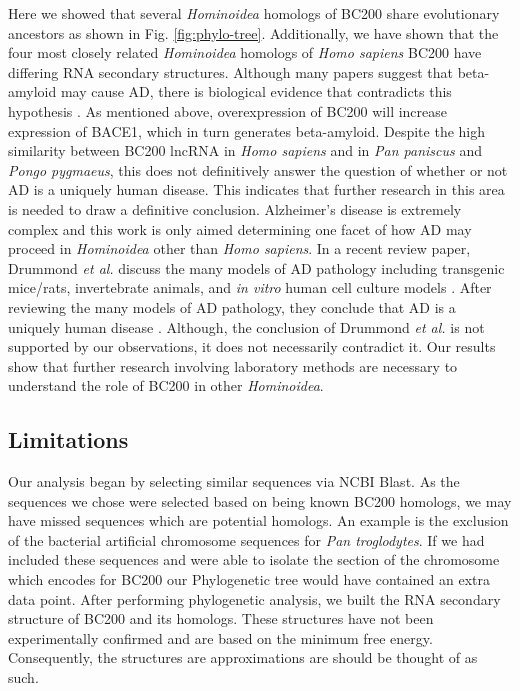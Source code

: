 \documentclass[conference, 11pt]{IEEEtran}
\begin{document}
Here we showed that several \emph{Hominoidea} homologs of BC200 share evolutionary ancestors as shown in Fig. \ref{fig:phylo-tree}. 
Additionally, we have shown that the four most closely related \emph{Hominoidea} homologs of \emph{Homo sapiens} BC200 have differing RNA secondary structures.
Although many papers suggest that beta-amyloid may cause AD, there is biological evidence that contradicts this hypothesis \cite{selkoe2016amyloid}.
As mentioned above, overexpression of BC200 will increase expression of BACE1, which in turn generates beta-amyloid. 
Despite the high similarity between BC200 lncRNA in \emph{Homo sapiens} and in \emph{Pan paniscus} and \emph{Pongo pygmaeus}, this does not definitively answer the question of whether or not AD is a uniquely human disease.
This indicates that further research in this area is needed to draw a definitive conclusion. 
Alzheimer’s disease is extremely complex and this work is only aimed determining one facet of how AD may proceed in \emph{Hominoidea} other than \emph{Homo sapiens}. 
In a recent review paper, Drummond \emph{et al.} discuss the many models of AD pathology including transgenic mice/rats, invertebrate animals, and \emph{in vitro} human cell culture models \cite{drummond2017alzheimer}. 
After reviewing the many models of AD pathology, they conclude that AD is a uniquely human disease \cite{drummond2017alzheimer}. 
Although, the conclusion of Drummond \emph{et al.} is not supported by our observations, it does not necessarily contradict it. 
Our results show that further research involving laboratory methods are necessary to understand the role of BC200 in other \emph{Hominoidea}.

\subsection{Limitations}

Our analysis began by selecting similar sequences via NCBI Blast. 
As the sequences we chose were selected based on being known BC200 homologs, we may have missed sequences which are potential homologs. 
An example is the exclusion of the bacterial artificial chromosome sequences for \emph{Pan troglodytes}. 
If we had included these sequences and were able to isolate the section of the chromosome which encodes for BC200 our Phylogenetic tree would have contained an extra data point.
After performing phylogenetic analysis, we built the RNA secondary structure of BC200 and its homologs. 
These structures have not been experimentally confirmed and are based on the minimum free energy. 
Consequently, the structures are approximations are should be thought of as such.
\end{document}
